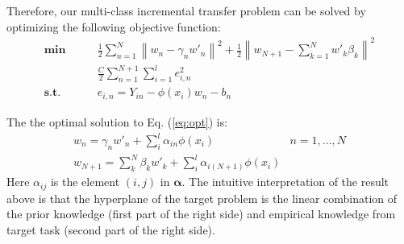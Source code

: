 Therefore, our multi-class incremental transfer problem can be solved by optimizing the following objective function:
\begin{equation}
\begin{aligned}
\textbf{min}\qquad {} & \frac{1}{2}\sum\limits_{n = 1}^N {{{\left\| {{w_n} - {\gamma _n}{{w'}_n}} \right\|}^2}}  + \frac{1}{2}{\left\| {{w_{N + 1}} - \sum\limits_{k = 1}^N {w{'_k}{\beta _k}} } \right\|^2}\\& \frac{C}{2}\sum\limits_{n = 1}^{N + 1} {\sum\limits_{i = 1}^l {e_{i,n}^2} }  \\
\textbf{s.t.}\qquad {} &{e_{i,n}} = {Y_{in}} - \phi ({x_i}){w_n} - {b_n}
\end{aligned}\label{eq:opt}
\end{equation}

The the optimal solution to  Eq. (\ref{eq:opt}) is:
\begin{equation*}
\begin{array}{*{20}{c}}
{{w_n} = {\gamma _n}{{w'}_n} + \sum\limits_i^l {{\alpha _{in}}{\phi(x_i)}} }&{n = 1,...,N}\\
{{w_{N + 1}} = \sum\limits_k^N {{\beta _k}{{w'}_k}}  + \sum\limits_i^l {{\alpha _{i(N + 1)}}{\phi(x_i)}} }&{}
\end{array}
\end{equation*}
Here $\alpha_{ij}$ is the element $(i,j)$ in $\boldsymbol{\alpha}$. The intuitive interpretation of the result above is that the hyperplane of the target problem is the linear combination of the prior knowledge (first part of the right side) and empirical knowledge from target task (second part of the right side).

